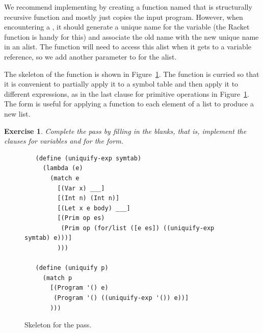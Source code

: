\documentclass[11pt]{book}
\newtheorem{exercise}[theorem]{Exercise}
\begin{document}
We recommend implementing  by creating a function named
 that is structurally recursive function and mostly
just copies the input program. However, when encountering a ,
it should generate a unique name for the variable (the Racket function
 is handy for this) and associate the old name with the
new unique name in an alist. The 
function will need to access this alist when it gets to a
variable reference, so we add another parameter to 
for the alist.


The skeleton of the  function is shown in
Figure~\ref{fig:uniquify-s0}.  The function is curried so that it is
convenient to partially apply it to a symbol table and then apply it
to different expressions, as in the last clause for primitive
operations in Figure~\ref{fig:uniquify-s0}.  The \href{https://docs.racket-lang.org/reference/for.html#%28form._%28%28lib._racket%2Fprivate%2Fbase..rkt%29._for%2Flist%29%29}{\key{for/list}}
form is useful for applying a function to each element of a list to produce
a new list.

\begin{exercise}
\normalfont %

Complete the  pass by filling in the blanks, that is,
implement the clauses for variables and for the  form.
\end{exercise}

\begin{figure}[tbp]
\begin{lstlisting}
   (define (uniquify-exp symtab)
     (lambda (e)
       (match e
         [(Var x) ___]
         [(Int n) (Int n)]
         [(Let x e body) ___]
         [(Prim op es)
          (Prim op (for/list ([e es]) ((uniquify-exp symtab) e)))]
         )))

   (define (uniquify p)
     (match p
       [(Program '() e)
        (Program '() ((uniquify-exp '()) e))]
       )))
\end{lstlisting}
\caption{Skeleton for the  pass.}
\label{fig:uniquify-s0}
\end{figure}
\end{document}
